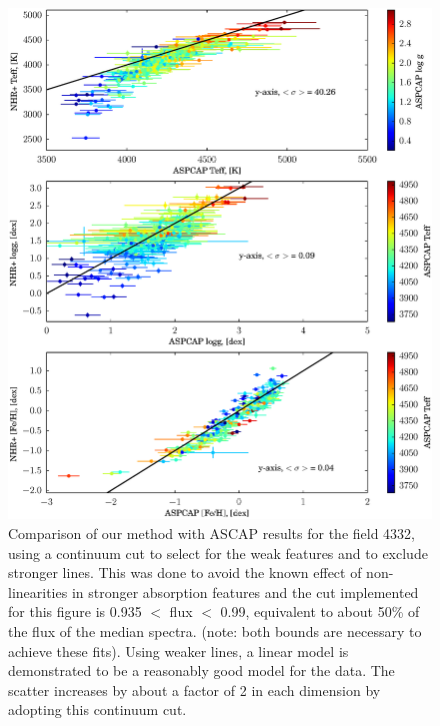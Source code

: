 \documentclass[12pt, preprint]{aastex}
\begin{document}
\begin{figure}[h!]
  \includegraphics[width=\hsize]{./plots/fits_all3_continuumcut.eps}
\caption{\small{Comparison of our method with ASCAP results for the field 4332, using a continuum cut to select for the weak features and to exclude stronger lines. This was done to avoid the known effect of non-linearities in stronger absorption features and the cut implemented for this figure is 0.935 $<$ flux $<$ 0.99, equivalent to about 50\% of the flux of the median spectra. (note: both bounds are necessary to achieve these fits). Using weaker lines, a linear model is demonstrated to be a reasonably good model for the data. The scatter increases by about a factor of 2 in each dimension by adopting this continuum cut. }}
\label{fig:cut1}
\end{figure}
\end{document}
